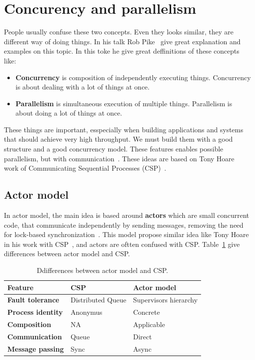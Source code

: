 \section{Concurency and parallelism}\label{sec:concurency_parallelism}
%
People usually confuse these two concepts. Even they looks similar, they are different way of doing things. In his talk Rob Pike~\cite{Pike} give great explanation and examples on this topic. In this toke he give great deffinitions of these concepts like:

\begin{itemize}
	\item \textbf{Concurrency} is composition of independently executing things. Concurrency is about dealing with a lot of things at once.
	\item \textbf{Parallelism} is simultaneous execution of multiple things. Parallelism is about doing a lot of things at once. 
\end{itemize}

These things are important, esspecially when building applications and systems that should achieve very high throughput. We must build them with a good structure and a good concurrency model. These features enables possible parallelism, but with communication~\cite{Pike}. These ideas are based on Tony Hoare work of Communicating Sequential Processes (CSP)~\cite{Hoare78}.

\subsection{Actor model}\label{sec:actor_model}
%
In actor model, the main idea is based around \textbf{actors} which are small concurrent code, that communicate independently by sending messages, removing the need for lock-based synchronization~\cite{Hewitt}. This model propose similar idea like Tony Hoare in his work with CSP~\cite{Hoare78}, and actors are oftten confused with CSP. Table~\ref{tab:table6} give differences between actor model and CSP.

\begin{table}[h!]
	\begin{center}
		\begin{tabular}{l|l|l}
			\textbf{Feature} & \textbf{CSP} & \textbf{Actor model}\\
			\hline
			\textbf{Fault tolerance} & Distributed Queue &  Supervisors hierarchy \\
			\textbf{Process identity} & Anonymus & Concrete \\
			\textbf{Composition} & NA & Applicable \\
			\textbf{Communication} & Queue & Direct \\
			\textbf{Message passing} & Sync & Async\\
		\end{tabular}
	\end{center}
	\vspace{-0.5cm}
	\caption{Ddifferences between actor model and CSP.}
	\label{tab:table6}
\end{table}

